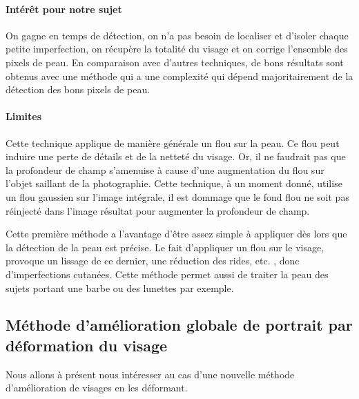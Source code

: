 \documentclass[11pt, french,screen]{report-rd-info}
\begin{document}
\paragraph{Intérêt pour notre sujet}
On gagne en temps de détection, on n’a pas besoin de localiser et d’isoler chaque petite imperfection, on récupère la totalité du visage et on corrige l’ensemble des pixels de peau. En comparaison avec d’autres techniques, de bons résultats sont obtenus avec une méthode qui a une complexité qui dépend majoritairement de la détection des bons pixels de peau.
\paragraph{Limites}
Cette technique applique de manière générale un flou sur la peau. Ce flou peut induire une perte de détails et de la netteté du visage. Or, il ne faudrait pas que la profondeur de champ s’amenuise à cause d’une augmentation du flou sur l'objet saillant de la photographie. Cette technique, à un moment donné, utilise un flou gaussien sur l’image intégrale, il est dommage que le fond flou ne soit pas réinjecté dans l’image résultat pour augmenter la profondeur de champ.

Cette première méthode a l’avantage d’être assez simple à appliquer dès lors que la détection de la peau est précise. Le fait d’appliquer un flou sur le visage, provoque un lissage de ce dernier, une réduction des rides, etc. , donc d’imperfections cutanées. Cette méthode permet aussi de traiter la peau des sujets portant une barbe ou des lunettes par exemple.
\subsection{Méthode d’amélioration globale de portrait par déformation du visage}
Nous allons à présent nous intéresser au cas d’une nouvelle méthode d’amélioration de visages en les déformant.
\end{document}
